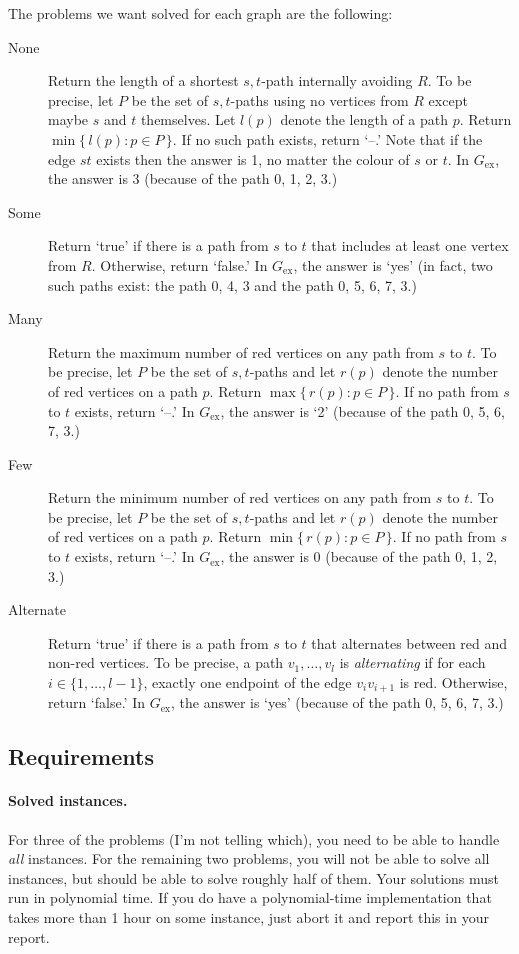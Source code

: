 \documentclass{tufte-handout}
\begin{document}
The problems we want solved for each graph are the following:
\begin{description}
  \item[None] Return the length of a shortest $s,t$-path internally avoiding $R$.
    To be precise, let $P$ be the set of $s,t$-paths using no vertices from $R$ except maybe $s$ and $t$ themselves. Let $l(p)$ denote the length of a path $p$.
    Return $\min\{\,l(p)\colon p\in P\,\}$.
    If no such path exists, return `--.'
    Note that if the edge $st$ exists then the answer is 1, no matter the colour of $s$ or $t$.
    In $G_{\text{ex}}$, the answer is 3 (because of the path 0, 1, 2, 3.)
  \item[Some] Return `true' if there is a path from $s$ to $t$ that includes at least one vertex from $R$.
    Otherwise, return `false.'
    In $G_{\text{ex}}$, the answer is `yes' (in fact, two such paths exist: the path 0, 4, 3 and the path 0, 5, 6, 7, 3.)
  \item [Many] Return the maximum number of red vertices on any path from $s$ to $t$.
    To be precise, let $P$ be the set of $s,t$-paths and let $r(p)$ denote the number of red vertices  on a path $p$.
    Return $\max\{\,r(p)\colon p\in P\,\}$.
    If no path from $s$ to $t$ exists, return `--.'
    In $G_{\text{ex}}$, the answer is `2' (because of the path 0, 5, 6, 7, 3.)
  \item [Few] Return the minimum number of red vertices on any path from $s$ to $t$.
    To be precise, let $P$ be the set of $s,t$-paths and let $r(p)$ denote the number of red vertices  on a path $p$.
    Return $\min\{\,r(p)\colon p\in P\,\}$.
    If no path from $s$ to $t$ exists, return `--.'
    In $G_{\text{ex}}$, the answer is 0 (because of the path 0, 1, 2, 3.)
  \item [Alternate] Return `true' if there is a path from $s$ to $t$ that alternates between red and non-red vertices.
    To be precise, a path $v_1,\ldots, v_l$ is \emph{alternating} if for each $i\in\{1,\ldots,l-1\}$, exactly one endpoint of the edge $v_iv_{i+1}$ is red.
    Otherwise, return `false.'
    In $G_{\text{ex}}$, the answer is `yes' (because of the path 0, 5, 6, 7, 3.)
\end{description}

\subsection{Requirements}
\paragraph{Solved instances.}
For three of the problems (I’m not telling which), you need to be able to handle \emph{all} instances.
For the remaining two problems, you will not be able to solve all instances, but should be able to solve roughly half of them.
Your solutions must run in polynomial time. 
If you do have a polynomial-time implementation that takes more than 1 hour on some instance, just abort it and report this in your report.
\end{document}
